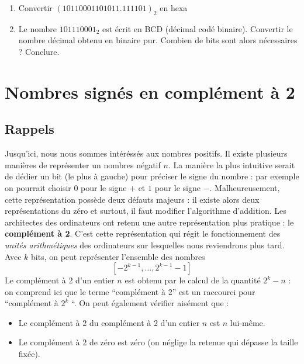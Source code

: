\documentclass[a4paper,11pt]{article}
\begin{document}
\begin{enumerate}
\item { Convertir  $(10110001101011.111101 )_2$ en hexa}

\item {Le nombre $101110001_2$ est écrit en BCD (décimal codé binaire). Convertir le nombre décimal obtenu en binaire pur. Combien de bits sont alors nécessaires ? Conclure.}
%

\end{enumerate}

\section{Nombres signés en complément à 2}

\subsection*{Rappels} Jusqu'ici, nous nous sommes intéréssés aux nombres positifs. Il existe plusieurs manières de représenter un nombres négatif $n$. La manière la plus intuitive serait de dédier un bit (le plus à gauche) pour préciser le signe du nombre : par exemple on pourrait choisir $0$ pour le signe $+$ et $1$ pour le signe $-$. Malheureusement, cette représentation possède deux défauts majeurs : il existe alors deux représentations du zéro et surtout, il faut modifier l'algorithme d'addition. Les architectes des ordinateurs ont retenu une autre représentation plus pratique : le {\bf complément à 2}. C'est cette représentation qui régit le fonctionnement des {\it unités arithmétiques} des ordinateurs sur lesquelles nous reviendrons plus tard.\\

Avec $k$ bits, on peut représenter l'ensemble des nombres $$[-2^{k-1},\dots,2^{k-1}-1]$$ Le complément à 2 d'un entier $n$ est obtenu par le calcul de la quantité $2^k - n$ : on comprend ici que le terme ``complément à 2'' est un raccourci pour ``complément à $2^k$ ``. On peut également vérifier aisément que :
\begin{itemize}
\item Le complément à 2 du complément à 2 d'un entier $n$ est $n$ lui-même.
\item Le complément à 2 de zéro est zéro (on néglige la retenue qui dépasse la taille fixée).
\end{itemize}
\end{document}
